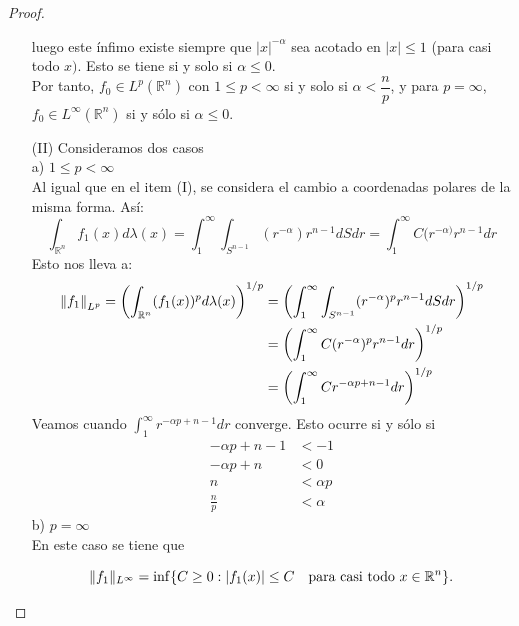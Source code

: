 \begin{proof}
\begin{enumerate}
luego este ínfimo existe siempre que
$|x|^{-\alpha}$ sea acotado en $|x| \leq 1$ (para casi todo $x)$.
Esto se tiene si y solo si $\alpha \leq 0$. \\
Por tanto, $f_0 \in L^p(\mathbb{R}^n)$ con $1 \leq p < \infty$ si y solo si $\alpha< \dfrac{n}{p}$, y para $p=\infty$, $f_0 \in L^\infty(\mathbb{R}^n)$ si y sólo si $\alpha\leq 0$.
\item[(II)] Consideramos dos casos \\
a) $1 \leq p < \infty$ \\
Al igual que en el item (I), se considera el cambio a coordenadas polares de la misma forma. Así:
\[
\int_{\mathbb{R}^n} f_1(x) d\lambda(x)=\int_1^{\infty}\int_{S^{n-1}}(r^{-\alpha})r^{n-1}dSdr=\int_1^{\infty}C(r^{-\alpha)}r^{n-1}dr
\]
Esto nos lleva a:
\begin{align*}
\left\|f_1\right\|_{L^p}=\left( \int_{\mathbb{R}^n} (f_1(x))^p d\lambda(x) \right)^{1/p}&= \left( \int_1^{\infty} \int_{S^{n-1}} (r^{-\alpha})^p r^{n-1} dS dr \right)^{1/p}\\&= \left( \int_1^{\infty} C (r^{-\alpha})^p r^{n-1} dr \right)^{1/p}\\&= \left( \int_1^{\infty} C r^{-\alpha p + n - 1} dr \right)^{1/p} 
\end{align*}
Veamos cuando $\displaystyle\int_1^{\infty} r^{-\alpha p + n - 1} dr$ converge. Esto ocurre si y sólo si
\begin{align*}
-\alpha p + n - 1 &< -1 \\
-\alpha p + n &< 0 \\
n &< \alpha p \\
\frac{n}{p} &< \alpha
\end{align*}
b) $p = \infty$ \\ En este caso se tiene que

\[\|f_1\|_{L^\infty} = \inf \{ C \geq 0 : |f_1(x)| \leq C \quad \text{para casi todo } x \in \mathbb{R}^{n}\}.\]


\end{enumerate}
\end{proof}
